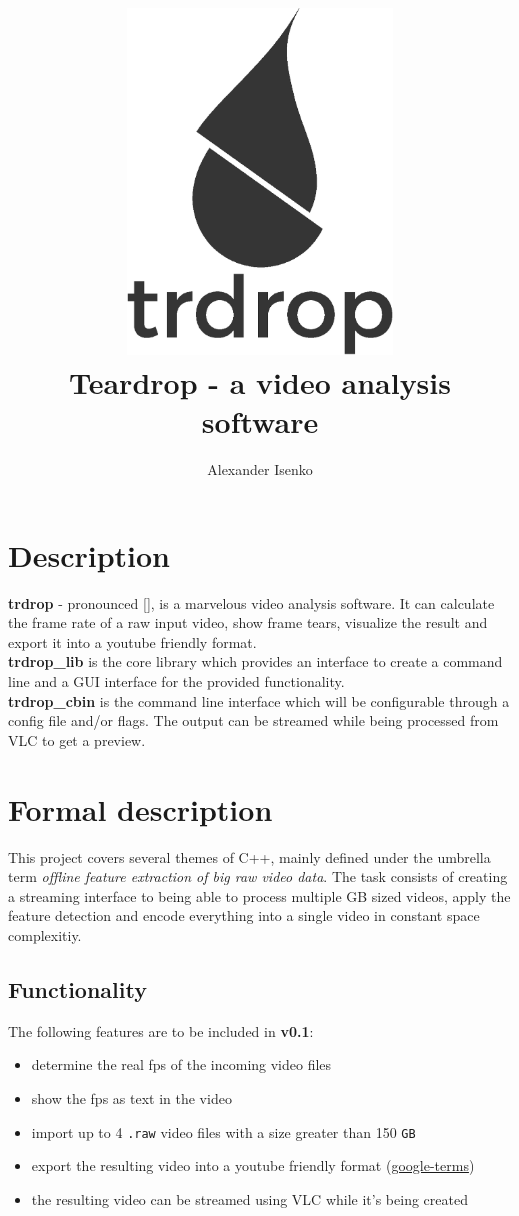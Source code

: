 \documentclass[titlepage]{article}
\title{\includegraphics[width=200pt, height=260pt]{../../images/trdrop_logo_text.eps} \\[50pt]
Teardrop - a video analysis software}
\author{Alexander Isenko}
\date{}
\begin{document}
\maketitle

\newpage

\section{Description}

\textbf{trdrop} - pronounced [\textit{}], is a marvelous video analysis software. It can calculate the frame rate of a raw input video, show frame tears, visualize the result and export it into a youtube friendly format. \\[2mm]
\hfill
\textbf{trdrop\_lib} is the core library which provides an interface to create a command line and a GUI interface for the provided functionality. \\[2mm]
\hfill
\textbf{trdrop\_cbin} is the command line interface which will be configurable through a config file and/or flags. The output can be streamed while being processed from VLC to get a preview.

\section{Formal description}

This project covers several themes of C++, mainly defined under the umbrella term \textit{offline feature extraction of big raw video data}. The task consists of creating a streaming interface to being able to process multiple GB sized videos, apply the feature detection and encode everything into a single video in constant space complexitiy.

\subsection{Functionality}

The following features are to be included in \textbf{v0.1}:

\begin{itemize}
    \item determine the real fps of the incoming video files
    \item show the fps as text in the video
    \item import up to 4 \texttt{.raw} video files with a size greater than 150 \texttt{GB}
    \item export the resulting video into a youtube friendly format (\href{https://support.google.com/youtube/answer/1722171}{google-terms})
    \item the resulting video can be streamed using VLC while it's being created
\end{itemize}
\end{document}
